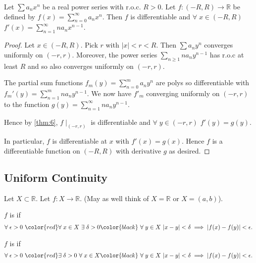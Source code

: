 \begin{theorem} \label{thm:11}
    Let $\sum a_n x^n$ be a real power series with r.o.c. $R > 0$.
    Let $f : (-R, R) \to \mathbb{R}$ be defined by $f(x) = \sum_{n=0}^{\infty} a_n x^n$.
    Then $f$ is differentiable and $\forall \; x \in (-R, R)$ $f'(x) = \sum_{n=1}^{\infty} n a_n x^{n - 1}$.
\end{theorem} 

\begin{proof}
    Let $x \in (-R, R)$.
    Pick $r$ with $|x| < r < R$.
    Then $\sum a_n y^n$ converges uniformly on $(-r, r)$.
    Moreover, the power series $\sum_{n \geq 1} n a_n y^{n - 1}$ has r.o.c at least $R$ and so also converges uniformly on $(-r, r)$.

    The partial sum functions $f_m(y) = \sum_{n=0}^{m} a_n y^n$ are polys so differentiable with $f_m'(y) = \sum_{n=1}^{m} n a_n y^{n - 1}$.
    We now have $f'_m$ converging uniformly on $(-r, r)$ to the function $g(y) = \sum_{n=1}^{\infty} n a_n y^{n - 1}$.

    Hence by \cref{thm:6}, $f \mid_{(-r, r)}$ is differentiable and $\forall \; y \in (-r, r)$ $f'(y) = g(y)$.

    In particular, $f$ is differentiable at $x$ with $f'(x) = g(x)$.
    Hence $f$ is a differentiable function on $(-R, R)$ with derivative $g$ as desired.
\end{proof} 

\subsection{Uniform Continuity}
Let $X \subset \mathbb{R}$.
Let $f: X \to \mathbb{R}$.
(May as well think of $X = \mathbb{R}$ or $X = (a, b)$).

\begin{definition}
    $f$ is  if 
    \begin{align*}
        \forall \; \epsilon > 0 \ \color{red} \forall \; x \in X \ \exists \; \delta > 0 \color{black} \ \forall \; y \in X \ |x - y| < \delta \implies |f(x) - f(y)| < \epsilon.
    \end{align*} 
\end{definition} 

\begin{definition}
    $f$ is  if 
    \begin{align*}
        \forall \; \epsilon > 0 \ \color{red} \exists \; \delta > 0 \ \forall \; x \in X \color{black} \ \forall \; y \in X \ |x - y| < \delta \implies |f(x) - f(y)| < \epsilon.
    \end{align*} 
\end{definition} 


